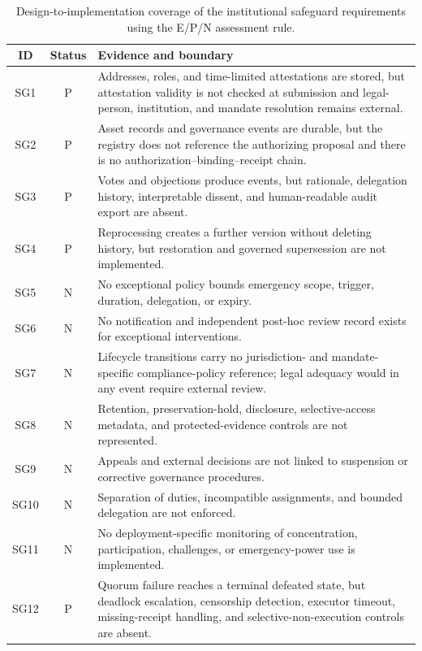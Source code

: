 \documentclass[journal]{IEEEtran}
\begin{document}
\begin{table}[t]
\centering
\caption{Design-to-implementation coverage of the institutional safeguard requirements using the E/P/N assessment rule.}
\label{tab:sg_coverage}
\renewcommand{\arraystretch}{1.08}
\scriptsize
\begin{tabular}{@{}c c p{13.8cm}@{}}
\toprule
\textbf{ID} & \textbf{Status} & \textbf{Evidence and boundary} \\
\midrule
SG1 & P & Addresses, roles, and time-limited attestations are stored, but attestation validity is not checked at submission and legal-person, institution, and mandate resolution remains external. \\
SG2 & P & Asset records and governance events are durable, but the registry does not reference the authorizing proposal and there is no authorization--binding--receipt chain. \\
SG3 & P & Votes and objections produce events, but rationale, delegation history, interpretable dissent, and human-readable audit export are absent. \\
SG4 & P & Reprocessing creates a further version without deleting history, but restoration and governed supersession are not implemented. \\
SG5 & N & No exceptional policy bounds emergency scope, trigger, duration, delegation, or expiry. \\
SG6 & N & No notification and independent post-hoc review record exists for exceptional interventions. \\
SG7 & N & Lifecycle transitions carry no jurisdiction- and mandate-specific compliance-policy reference; legal adequacy would in any event require external review. \\
SG8 & N & Retention, preservation-hold, disclosure, selective-access metadata, and protected-evidence controls are not represented. \\
SG9 & N & Appeals and external decisions are not linked to suspension or corrective governance procedures. \\
SG10 & N & Separation of duties, incompatible assignments, and bounded delegation are not enforced. \\
SG11 & N & No deployment-specific monitoring of concentration, participation, challenges, or emergency-power use is implemented. \\
SG12 & P & Quorum failure reaches a terminal defeated state, but deadlock escalation, censorship detection, executor timeout, missing-receipt handling, and selective-non-execution controls are absent. \\
\bottomrule
\end{tabular}
\end{table}
\end{document}
